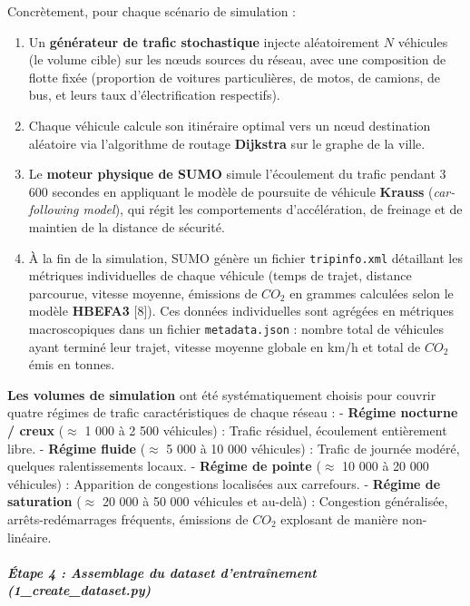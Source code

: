 \documentclass[10pt, a4paper]{article}
\providecommand{\tightlist}{}
\begin{document}
Concrètement, pour chaque scénario de simulation :

\begin{enumerate}
\def\labelenumi{\arabic{enumi}.}
\tightlist
\item
  Un \textbf{générateur de trafic stochastique} injecte aléatoirement
  \(N\) véhicules (le volume cible) sur les nœuds sources du réseau,
  avec une composition de flotte fixée (proportion de voitures
  particulières, de motos, de camions, de bus, et leurs taux
  d'électrification respectifs).
\item
  Chaque véhicule calcule son itinéraire optimal vers un nœud
  destination aléatoire via l'algorithme de routage \textbf{Dijkstra}
  sur le graphe de la ville.
\item
  Le \textbf{moteur physique de SUMO} simule l'écoulement du trafic
  pendant 3 600 secondes en appliquant le modèle de poursuite de
  véhicule \textbf{Krauss} (\emph{car-following model}), qui régit les
  comportements d'accélération, de freinage et de maintien de la
  distance de sécurité.
\item
  À la fin de la simulation, SUMO génère un fichier
  \texttt{tripinfo.xml} détaillant les métriques individuelles de chaque
  véhicule (temps de trajet, distance parcourue, vitesse moyenne,
  émissions de \(CO_2\) en grammes calculées selon le modèle
  \textbf{HBEFA3} {[}8{]}). Ces données individuelles sont agrégées en
  métriques macroscopiques dans un fichier \texttt{metadata.json} :
  nombre total de véhicules ayant terminé leur trajet, vitesse moyenne
  globale en km/h et total de \(CO_2\) émis en tonnes.
\end{enumerate}

\textbf{Les volumes de simulation} ont été systématiquement choisis pour
couvrir quatre régimes de trafic caractéristiques de chaque réseau : -
\textbf{Régime nocturne / creux} (\(\approx\) 1 000 à 2 500 véhicules) :
Trafic résiduel, écoulement entièrement libre. - \textbf{Régime fluide}
(\(\approx\) 5 000 à 10 000 véhicules) : Trafic de journée modéré,
quelques ralentissements locaux. - \textbf{Régime de pointe}
(\(\approx\) 10 000 à 20 000 véhicules) : Apparition de congestions
localisées aux carrefours. - \textbf{Régime de saturation} (\(\approx\)
20 000 à 50 000 véhicules et au-delà) : Congestion généralisée,
arrêts-redémarrages fréquents, émissions de \(CO_2\) explosant de
manière non-linéaire.

\subparagraph{Étape 4 : Assemblage du dataset d'entraînement
(1\_create\_dataset.py)}\label{uxe9tape-4-assemblage-du-dataset-dentrauxeenement-1_create_dataset.py}
\end{document}
